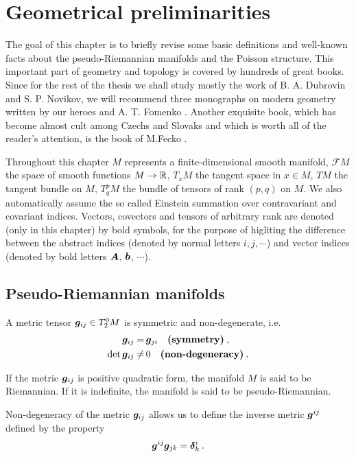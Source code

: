 \chapter{Geometrical preliminarities}

The goal of this chapter is to briefly revise some basic definitions and well-known facts about the pseudo-Riemannian manifolds and the Poisson structure. This important part of geometry and topology is covered by hundreds of great books. Since for the rest of the thesis we shall study mostly the work of B. A. Dubrovin and S. P. Novikov, we will recommend three monographs on modern geometry written by our heroes and A. T. Fomenko \cite{DN-Geometry1}. Another exquisite book, which has become almost cult among Czechs and Slovaks and which is worth all of the reader's attention, is the book of M.Fecko \cite{Fecko}.

Throughout this chapter $M$ represents a finite-dimensional smooth manifold, $\mathcal F M$ the space of smooth functions $M \to \mathbb{R}$, $T_x M$ the tangent space in $x \in M$, $T M$ the tangent bundle on $M$, $T^p_q M$ the bundle of tensors of rank $(p,q)$ on $M$. We also automatically assume the so called Einstein summation over contravariant and covariant indices. Vectors, covectors and tensors of arbitrary rank are denoted (only in this chapter) by bold symbols, for the purpose of higliting the difference between the abstract indices (denoted by normal letters $i,j,\cdots$) and vector indices (denoted by bold letters $\boldsymbol{A}$, $\boldsymbol{b}$, $\cdots$).

\section{Pseudo-Riemannian manifolds}

\begin{definition}
    A metric tensor $\boldsymbol{g}_{ij} \in T^0_2 M$ is symmetric and non-degenerate, i.e.
    \begin{align}
        \boldsymbol{g}_{ij} =&\, \boldsymbol{g}_{ji} \quad \textbf{(symmetry)}\:, \\ \det \boldsymbol{g}_{ij} \neq&\, 0 \quad \textbf{(non-degeneracy)}\:.
    \end{align}
\end{definition}

If the metric $\boldsymbol{g}_{ij}$ is positive quadratic form, the manifold $M$ is said to be Riemannian. If it is indefinite, the manifold is said to be pseudo-Riemannian.

Non-degeneracy of the metric $\boldsymbol{g}_{ij}$ allows us to define the inverse metric $\boldsymbol{g}^{ij}$ defined by the property
\begin{align}
    \boldsymbol{g}^{ij} \boldsymbol{g}_{jk} = \boldsymbol{\delta}^i_k \:.
\end{align}

